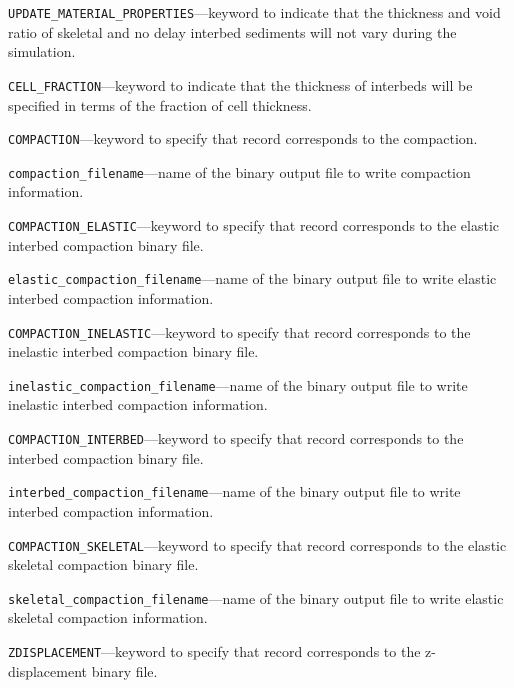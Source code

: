\begin{description}
\item \texttt{UPDATE\_MATERIAL\_PROPERTIES}---keyword to indicate that the thickness and void ratio of skeletal and no delay interbed sediments will not vary during the simulation.

\item \texttt{CELL\_FRACTION}---keyword to indicate that the thickness of interbeds will be specified in terms of the fraction of cell thickness.

\item \texttt{COMPACTION}---keyword to specify that record corresponds to the compaction.

\item \texttt{compaction\_filename}---name of the binary output file to write compaction information.

\item \texttt{COMPACTION\_ELASTIC}---keyword to specify that record corresponds to the elastic interbed compaction binary file.

\item \texttt{elastic\_compaction\_filename}---name of the binary output file to write elastic interbed compaction information.

\item \texttt{COMPACTION\_INELASTIC}---keyword to specify that record corresponds to the inelastic interbed compaction binary file.

\item \texttt{inelastic\_compaction\_filename}---name of the binary output file to write inelastic interbed compaction information.

\item \texttt{COMPACTION\_INTERBED}---keyword to specify that record corresponds to the interbed compaction binary file.

\item \texttt{interbed\_compaction\_filename}---name of the binary output file to write interbed compaction information.

\item \texttt{COMPACTION\_SKELETAL}---keyword to specify that record corresponds to the elastic skeletal compaction binary file.

\item \texttt{skeletal\_compaction\_filename}---name of the binary output file to write elastic skeletal compaction information.

\item \texttt{ZDISPLACEMENT}---keyword to specify that record corresponds to the z-displacement binary file.


\end{description}
